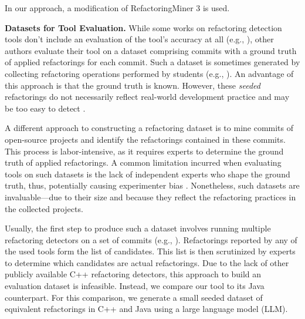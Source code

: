In our approach, a modification of RefactoringMiner 3 is used.

\noindent\textbf{Datasets for Tool Evaluation.} While some works on refactoring detection tools don't include an evaluation of the tool's accuracy at all (e.g., \cite{ase21javaKotlinRefactoringInJetBrainsIde}), other authors evaluate their tool on a dataset comprising commits with a ground truth of applied refactorings for each commit. Such a dataset is sometimes generated by collecting refactoring operations performed by students (e.g., \cite{ieeeMsr17refdiff,ieeeAccess21refdetect}). An advantage of this approach is that the ground truth is known. However, these \emph{seeded} refactorings do not necessarily reflect real-world development practice and may be too easy to detect \cite{tse20refactoringMiner2}.

A different approach to constructing a refactoring dataset is to mine commits of open-source projects and identify the refactorings contained in these commits. This process is labor-intensive, as it requires experts to determine the ground truth of applied refactorings. %
A common limitation incurred when evaluating tools on such datasets is the lack of independent experts who shape the ground truth, thus, potentially causing experimenter bias \cite{tse20refactoringMiner2,ieeeAccess21refdetect}. Nonetheless, such datasets are invaluable---due to their size and because they reflect the refactoring practices in the collected projects.

Usually, the first step to produce such a dataset involves running multiple refactoring detectors on a set of commits (e.g., \cite{pyref,saner24kotlinWithRefDetect,icse18refactoringMiner,tse20refactoringMiner2}). Refactorings reported by any of the used tools form the list of candidates. This list is then scrutinized by experts to determine which candidates are actual refactorings. Due to the lack of other publicly available C++ refactoring detectors, this approach to build an evaluation dataset is infeasible. Instead, we compare our tool to its Java counterpart. For this comparison, we generate a small seeded dataset of equivalent refactorings in C++ and Java using a large language model (LLM).



